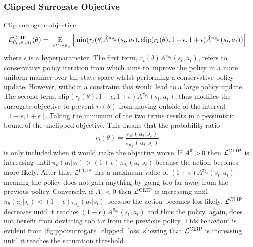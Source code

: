 \subsubsection{Clipped Surrogate Objective}
Clip surrogate objective
\newcommand{\Lclip}{\Lagr^\mathrm{CLIP}}
\begin{equation}
    \Lclip_{\theta_k, s_t, a_t} (\theta) =
    \operatorname*{\mathbb{E}}\limits_{s,a\sim\pi_{\theta_k}}
    \left[
        \min(r_t(\theta)\hat A^{\pi_{\theta_k}}(s_t, a_t),
            \mathrm{clip}(
                r_t(\theta), 1-\epsilon, 1+\epsilon
            )\hat A^{\pi_{\theta_k}}(s_t, a_t)
        )
    \right]
    \label{eqn:rl:surrogate_clipped_objective}
\end{equation}
where $\epsilon$ is a hyperparameter. The first term, $r_t(\theta)A^{\pi_{\theta_k}}(s_t, a_t)$, refers to conservative policy iteration from \cite{kakade_approximately_2002} which aims to improve the policy in a more uniform manner over the state-space whilst performing a conservative policy update. However, without a constraint this would lead to a large policy update. The second term, $\mathrm{clip}(
    r_t(\theta), 1-\epsilon, 1+\epsilon
)A^{\pi_{\theta_k}}(s_t, a_t)$, thus modifies the surrogate objective to prevent $r_t(\theta)$ from moving outside of the interval $[1-\epsilon, 1+\epsilon]$. Taking the minimum of the two terms results in a pessimistic bound of the unclipped objective. This means that the probability ratio
\begin{equation}
    r_t(\theta) =
    \frac{
        \pi_\theta (a_t | s_t)
    }{
        \pi_{\theta_k} (a_t | s_t)
    }
\end{equation}
is only included when it would make the objective worse. If $A^\pi > 0$ then $\Lclip$ is increasing until $\pi_\theta(a_t|s_t) > (1+\epsilon)\pi_{\theta_k} (a_t | s_t)$ because the action becomes more likely. After this, $\Lclip$ has a maximum value of $(1+\epsilon)A^{\pi_{\theta_k}}(s_t, a_t)$ meaning the policy does not gain anything by going too far away from the previous policy. Conversely, if $A^\pi < 0$ then $\Lclip$ is increasing until $\pi_\theta(a_t|s_t) < (1-\epsilon)\pi_{\theta_k} (a_t | s_t)$ because the action becomes less likely. $\Lclip$ decreases until it reaches $(1-\epsilon)A^{\pi_{\theta_k}}(s_t, a_t)$ and thus the policy, again, does not benefit from deviating too far from the previous policy. This behaviour is evident from \autoref{fig:ppo:surrogate_clipped_loss} showing that $\Lclip$ is increasing until it reaches the saturation threshold.

